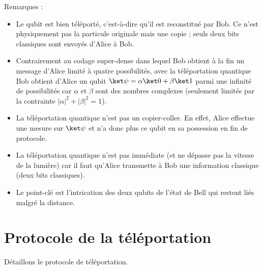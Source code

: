 \documentclass[11pt,class=report,crop=false]{standalone}
\begin{document}
Remarques :
\begin{itemize}
  \item Le qubit est bien \og{}téléporté\fg{}, c'est-à-dire qu'il est reconstitué par Bob. Ce n'est physiquement pas la particule originale mais une copie ; seuls deux bits classiques sont envoyés d'Alice à Bob.

  \item Contrairement au codage super-dense dans lequel Bob obtient à la fin  un message d'Alice limité à quatre possibilités, avec la téléportation quantique Bob obtient d'Alice un qubit $\ket\psi = \alpha\ket0 + \beta\ket1$ parmi une infinité de possibilités car $\alpha$ et $\beta$ sont des nombres complexes (seulement limités par la contrainte $|\alpha|^2+|\beta|^2=1$).
  
  \item La téléportation quantique n'est pas un \og{}copier-coller\fg{}. En effet, Alice effectue une mesure sur $\ket\psi$ et n'a donc plus ce qubit en sa possession en fin de protocole.

  \item La téléportation quantique n'est pas immédiate (et ne dépasse pas la vitesse de la lumière) car il faut qu'Alice transmette à Bob une information classique (deux bits classiques).

  \item Le point-clé est l'intrication des deux qubits de l'état de Bell qui restent liés malgré la distance.

\end{itemize}


\section{Protocole de la téléportation}

Détaillons le protocole de téléportation.


\end{document}
